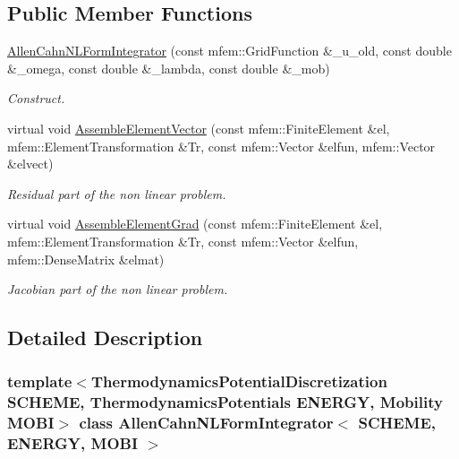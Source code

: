 \subsection*{Public Member Functions}
\begin{DoxyCompactItemize}
\item 
\hyperlink{classAllenCahnNLFormIntegrator_aa683f1361b0fb5c0c29848bf020eebd3}{Allen\+Cahn\+N\+L\+Form\+Integrator} (const mfem\+::\+Grid\+Function \&\+\_\+u\+\_\+old, const double \&\+\_\+omega, const double \&\+\_\+lambda, const double \&\+\_\+mob)
\begin{DoxyCompactList}\small\item\em Construct. \end{DoxyCompactList}\item 
virtual void \hyperlink{classAllenCahnNLFormIntegrator_a4cb7cff96ecd5b236ba1573b4fdc816c}{Assemble\+Element\+Vector} (const mfem\+::\+Finite\+Element \&el, mfem\+::\+Element\+Transformation \&Tr, const mfem\+::\+Vector \&elfun, mfem\+::\+Vector \&elvect)
\begin{DoxyCompactList}\small\item\em Residual part of the non linear problem. \end{DoxyCompactList}\item 
virtual void \hyperlink{classAllenCahnNLFormIntegrator_a0370504d306247b934fee91ed117104a}{Assemble\+Element\+Grad} (const mfem\+::\+Finite\+Element \&el, mfem\+::\+Element\+Transformation \&Tr, const mfem\+::\+Vector \&elfun, mfem\+::\+Dense\+Matrix \&elmat)
\begin{DoxyCompactList}\small\item\em Jacobian part of the non linear problem. \end{DoxyCompactList}\end{DoxyCompactItemize}


\subsection{Detailed Description}
\subsubsection*{template$<$Thermodynamics\+Potential\+Discretization S\+C\+H\+E\+ME, Thermodynamics\+Potentials E\+N\+E\+R\+GY, Mobility M\+O\+BI$>$\newline
class Allen\+Cahn\+N\+L\+Form\+Integrator$<$ S\+C\+H\+E\+M\+E, E\+N\+E\+R\+G\+Y, M\+O\+B\+I $>$}



